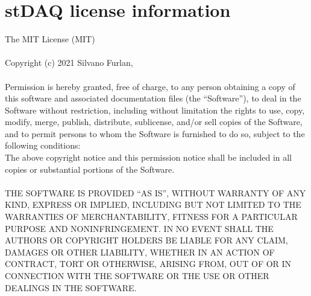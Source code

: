 \documentclass[letterpaper,10pt,english]{hitec}
\begin{document}



\newpage

\section{stDAQ license information}

The MIT License (MIT)
\\
\\
Copyright (c) 2021 Silvano Furlan,
\\
\\
Permission is hereby granted, free of charge, to any person obtaining a copy
of this software and associated documentation files (the “Software”), to deal
in the Software without restriction, including without limitation the rights
to use, copy, modify, merge, publish, distribute, sublicense, and/or sell
copies of the Software, and to permit persons to whom the Software is
furnished to do so, subject to the following conditions:
\\
The above copyright notice and this permission notice shall be included in
all copies or substantial portions of the Software.
\\
\\
THE SOFTWARE IS PROVIDED “AS IS”, WITHOUT WARRANTY OF ANY KIND, EXPRESS OR
IMPLIED, INCLUDING BUT NOT LIMITED TO THE WARRANTIES OF MERCHANTABILITY,
FITNESS FOR A PARTICULAR PURPOSE AND NONINFRINGEMENT. IN NO EVENT SHALL THE
AUTHORS OR COPYRIGHT HOLDERS BE LIABLE FOR ANY CLAIM, DAMAGES OR OTHER
LIABILITY, WHETHER IN AN ACTION OF CONTRACT, TORT OR OTHERWISE, ARISING FROM,
OUT OF OR IN CONNECTION WITH THE SOFTWARE OR THE USE OR OTHER DEALINGS IN
THE SOFTWARE.
\end{document}
